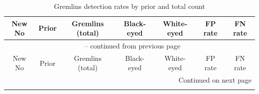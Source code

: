 \begin{longtable}{ccccccc}
\caption{Gremlins detection rates by prior and total count} \label{tab:gremlins} \\
\toprule
New No & Prior & Gremlins (total) & Black-eyed & White-eyed & FP rate & FN rate \\
\midrule
\endfirsthead

\multicolumn{7}{c}{{\tablename\ \thetable{} -- continued from previous page}} \\
\toprule
New No & Prior & Gremlins (total) & Black-eyed & White-eyed & FP rate & FN rate \\
\midrule
\endhead

\midrule
\multicolumn{7}{r}{{Continued on next page}} \\
\endfoot

\bottomrule
\endlastfoot


\end{longtable}
